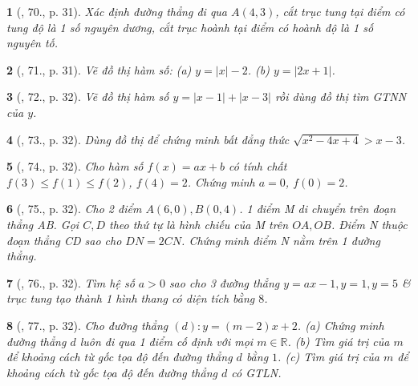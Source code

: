 \documentclass{article}
\newtheorem{baitoan}{}
\begin{document}
\begin{baitoan}[\cite{Binh_Toan_9_tap_1}, 70., p. 31]
	Xác định đường thẳng đi qua $A(4,3)$, cắt trục tung tại điểm có tung độ là 1 số nguyên dương, cắt trục hoành tại điểm có hoành độ là 1 số nguyên tố.
\end{baitoan}

\begin{baitoan}[\cite{Binh_Toan_9_tap_1}, 71., p. 31]
	Vẽ đồ thị hàm số: (a) $y = |x| - 2$. (b) $y = |2x + 1|$.
\end{baitoan}

\begin{baitoan}[\cite{Binh_Toan_9_tap_1}, 72., p. 32]
	Vẽ đồ thị hàm số $y = |x - 1| + |x - 3|$ rồi dùng đồ thị tìm {\rm GTNN} của $y$.
\end{baitoan}

\begin{baitoan}[\cite{Binh_Toan_9_tap_1}, 73., p. 32]
	Dùng đồ thị để chứng minh bất đẳng thức $\sqrt{x^2 - 4x + 4} > x - 3$.
\end{baitoan}

\begin{baitoan}[\cite{Binh_Toan_9_tap_1}, 74., p. 32]
	Cho hàm số $f(x) = ax + b$ có tính chất $f(3)\le f(1)\le f(2)$, $f(4) = 2$. Chứng minh $a = 0$, $f(0) = 2$.
\end{baitoan}

\begin{baitoan}[\cite{Binh_Toan_9_tap_1}, 75., p. 32]
	Cho 2 điểm $A(6,0),B(0,4)$. 1 điểm M di chuyển trên đoạn thẳng AB. Gọi $C,D$ theo thứ tự là hình chiếu của M trên $OA,OB$. Điểm N thuộc đoạn thẳng CD sao cho $DN = 2CN$. Chứng minh điểm N nằm trên 1 đường thẳng.
\end{baitoan}

\begin{baitoan}[\cite{Binh_Toan_9_tap_1}, 76., p. 32]
	Tìm hệ số $a > 0$ sao cho 3 đường thẳng $y = ax - 1,y = 1,y = 5$ \& trục tung tạo thành 1 hình thang có diện tích bằng $8$.
\end{baitoan}

\begin{baitoan}[\cite{Binh_Toan_9_tap_1}, 77., p. 32]
	Cho đường thẳng $(d):y = (m - 2)x + 2$. (a) Chứng minh đường thẳng $d$ luôn đi qua 1 điểm cố định với mọi $m\in\mathbb{R}$. (b) Tìm giá trị của $m$ để khoảng cách từ gốc tọa độ đến đường thẳng $d$ bằng $1$. (c) Tìm giá trị của $m$ để khoảng cách từ gốc tọa độ đến đường thẳng $d$ có {\rm GTLN}.
\end{baitoan}
\end{document}
